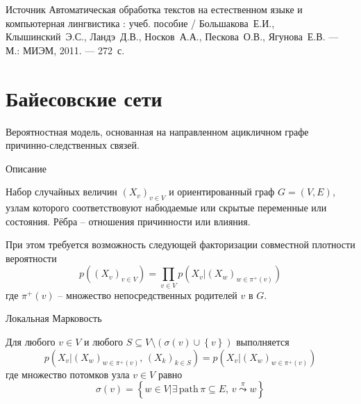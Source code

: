 \documentclass{beamer}
\newcommand{\obj}[1]{\left\{ #1 \right \}}
\newcommand{\brac}[1]{\left ( #1 \right )}
\newcommand{\induc}[1]{\left . #1 \right \vert}
\begin{document}
\begin{frame}
  \begin{block}{Источник}
    Автоматическая обработка текстов на естественном языке и компьютерная лингвистика : учеб. пособие / Большакова~Е.И., Клышинский~Э.С., Ландэ~Д.В., Носков~А.А., Пескова~О.В., Ягунова~Е.В. — М.: МИЭМ, 2011. — 272~с. 
  \end{block}
\end{frame}


\section{Байесовские сети} %
\label{sec:bayesian_networks}

\begin{frame}
  \begin{block}

    Вероятностная модель, основанная на направленном ацикличном графе причинно-следственных связей.
  \end{block}
  \begin{block}{Описание}

    Набор случайных величин $\brac{X_v}_{v\in V}$ и ориентированный граф $G=(V,E)$, узлам которого соответствовуют набюдаемые или скрытые переменные или состояния. Рёбра -- отношения причинности или влияния.

    При этом требуется возможность следующей факторизации совместной плотности вероятности
    \[p\brac{\brac{X_v}_{v\in V}} = \prod_{v\in V} p\brac{\induc{X_v} \brac{X_w}_{w\in\pi^+(v)}}\]
    где $\pi^+(v)$ -- множество непосредственных родителей $v$ в $G$.
  \end{block}
\end{frame}

\begin{frame}
  \begin{block}{Локальная Марковость}

    Для любого $v\in V$ и любого $S\subseteq V\setminus\brac{\sigma(v)\cup\obj{v}}$ выполняется
    \[p\brac{\induc{X_v}\brac{X_w}_{w\in \pi^+(v)},\,\brac{X_k}_{k\in S} } = p\brac{\induc{X_v}\brac{X_w}_{w\in \pi^+(v)} }\]
    где множество потомков узла $v\in V$ равно
    \[\sigma(v) = \obj{\induc{w\in V} \exists\,\text{path}\,\pi\subseteq E,\, v\overset{\pi}{\leadsto}w}\]
    
  \end{block}

\end{frame}
\end{document}
